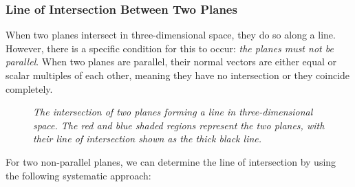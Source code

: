 \subsubsection*{Line of Intersection Between Two Planes}

\noindent When two planes intersect in three-dimensional space, they do so along a line. However, there is a specific condition for this to occur: \textit{the planes must not be parallel}. When two planes are parallel, their normal vectors are either equal or scalar multiples of each other, meaning they have no intersection or they coincide completely. 


\begin{figure}[H]
    \centering
{}
\caption{\textit{The intersection of two planes forming a line in three-dimensional space. The red and blue shaded regions represent the two planes, with their line of intersection shown as the thick black line.}}
    \label{fig:plane_intersection}
\end{figure}

\noindent For two non-parallel planes, we can determine the line of intersection by using the following systematic approach:

